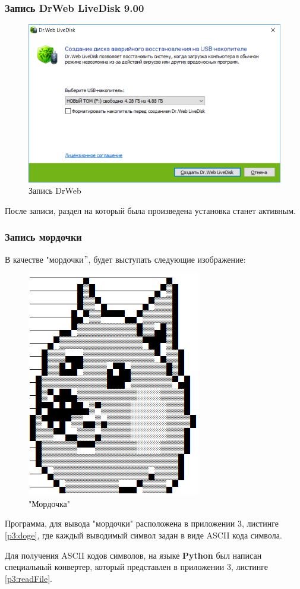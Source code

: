 \subsubsection{Запись DrWeb LiveDisk 9.00}
\begin{figure}[H]
  \centering
  \includegraphics[width=.8\textwidth]{img/p3/drweb}
  \caption{Запись DrWeb}
\end{figure}
После записи, раздел на который была произведена установка станет активным.

\subsubsection{Запись мордочки}
В качестве "мордочки$"$, будет выступать следующие изображение:
\begin{figure}[H]
  \centering
  \includegraphics[width=.35\textwidth]{img/p3/doge}
  \caption{"Мордочка"}
\end{figure}
Программа, для вывода "мордочки" расположена в приложении 3, листинге \ref{p3:doge}, где каждый выводимый символ задан в виде ASCII кода символа.

Для получения ASCII кодов символов, на языке \textbf{Python} был написан специальный конвертер, который представлен в приложении 3, листинге \ref{p3:readFile}.

